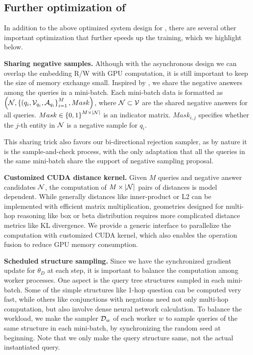 

\subsection{Further optimization of \modelshort}
\label{sec:more_opt}


In addition to the above optimized system design for \modelshort, there are several other important optimization that further speeds up the training, which we highlight below.


\textbf{Sharing negative samples.}
Although with the asynchronous design we can overlap the embedding R/W with GPU computation, it is still important to keep the size of memory exchange small. Inspired by \citet{zheng2020dgl}, we share the negative answers among the queries in a mini-batch. Each mini-batch data is formatted as $\left(\mathcal{N}, \left\{(q_i, \mathcal{V}_{q_i}, \mathcal{A}_{q_i}\right\}_{i=1}^M, Mask\right)$, where $\mathcal{N} \subset \mathcal{V}$ are the shared negative answers for all queries. $Mask \in \left\{0, 1\right\}^{M \times |\mathcal{N}|}$ is an indicator matrix. $Mask_{i, j}$ specifies whether the $j$-th entity in $\mathcal{N}$ is a negative sample for $q_i$. 

This sharing trick also favors our bi-directional rejection sampler, as by nature it is the sample-and-check process, with the only adaptation that all the queries in the same mini-batch share the support of negative sampling proposal. 

\textbf{Customized CUDA distance kernel.}
Given $M$ queries and negative answer candidates $\mathcal{N}$, the computation of $M \times |\mathcal{N}|$ pairs of distances is model dependent. While generally distances like inner-product or L2 can be implemented with efficient matrix multiplication, geometries designed for multi-hop reasoning like box or beta distribution requires more complicated distance metrics like KL divergence. We provide a generic interface to parallelize the computation with customized CUDA kernel, which also enables the operation fusion to reduce GPU memory consumption.


\textbf{Scheduled structure sampling. }
Since we have the synchronized gradient update for $\theta_D$ at each step, it is important to balance the computation among worker processes. One aspect is the query tree structures sampled in each mini-batch. Some of the simple structures like 1-hop question can be computed very fast, while others like conjunctions with negations need not only multi-hop computation, but also involve dense neural network calculation. To balance the workload, we make the sampler $\mathcal{D}_w$ of each worker $w$ to sample queries of the same structure in each mini-batch, by synchronizing the random seed at beginning. Note that we only make the query structure same, not the actual instantiated query.
